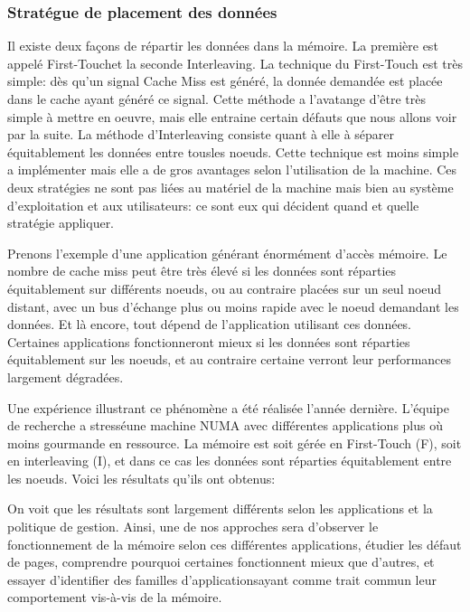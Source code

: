       \subsubsection{Stratégue de placement des données}
      
        Il existe deux façons de répartir les données dans la mémoire. La
        première est appelé \og First-Touch\fg et la seconde \og
        Interleaving\fg. La technique du First-Touch est très simple: dès qu'un
        signal Cache Miss est généré, la donnée demandée est placée dans le
        cache ayant généré ce signal. Cette méthode a l'avatange d'être très
        simple à mettre en oeuvre, mais elle entraine certain défauts que nous
        allons voir par la suite. La méthode d'Interleaving consiste quant à
        elle à séparer équitablement les données entre \og tous\fg les
        noeuds. Cette technique est moins simple a implémenter mais elle a de
        gros avantages selon l'utilisation de la machine. Ces deux stratégies ne
        sont pas liées au matériel de la machine mais bien au système
        d'exploitation et aux utilisateurs: ce sont eux qui décident quand et
        quelle stratégie appliquer.\newline

        Prenons l'exemple d'une application générant énormément d'accès
        mémoire. Le nombre de cache miss peut être très élevé si les données
        sont réparties équitablement sur différents noeuds, ou au contraire
        placées sur un seul noeud distant, avec un bus d'échange plus ou moins
        rapide avec le noeud demandant les données. Et là encore, tout dépend de
        l'application utilisant ces données. Certaines applications
        fonctionneront mieux si les données sont réparties équitablement sur les
        noeuds, et au contraire certaine verront leur performances largement
        dégradées.\newline

        Une expérience illustrant ce phénomène a été réalisée l'année
        dernière\cite{Holistic2013}. L'équipe de recherche a \og stressé\fg une
        machine NUMA avec différentes applications plus où moins gourmande en
        ressource. La mémoire est soit gérée en \og First-Touch (F)\fg, soit en
        \og interleaving (I)\fg, et dans ce cas les données sont réparties
        équitablement entre les noeuds. Voici les résultats qu'ils ont obtenus:

      
        On voit que les résultats sont largement différents selon les
        applications et la politique de gestion. Ainsi, une de nos approches
        sera d'observer le fonctionnement de la mémoire selon ces différentes
        applications, étudier les défaut de pages, comprendre pourquoi certaines
        fonctionnent mieux que d'autres, et essayer d'identifier des \og
        familles d'applications\fg ayant comme trait commun leur comportement
        vis-à-vis de la mémoire.    
    


  
